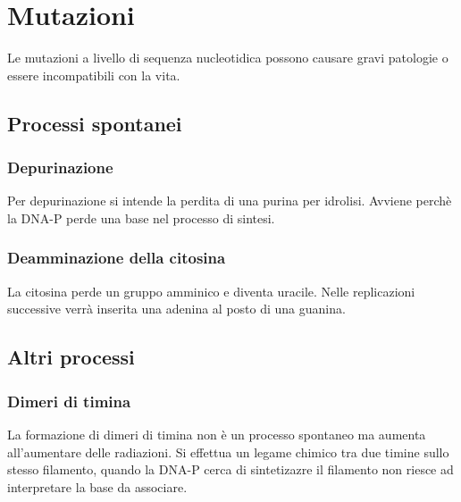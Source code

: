\section{Mutazioni}
    Le mutazioni a livello di sequenza nucleotidica possono causare gravi patologie o essere incompatibili con la vita.
    \subsection{Processi spontanei}
        \subsubsection{Depurinazione}
            Per depurinazione si intende la perdita di una purina per idrolisi. Avviene perchè la DNA-P perde una base nel processo di sintesi.
        \subsubsection{Deamminazione della citosina}
            La citosina perde un gruppo amminico e diventa uracile. Nelle replicazioni successive verrà inserita una adenina al posto di una guanina.
    
    \subsection{Altri processi}
        \subsubsection{Dimeri di timina}
            La formazione di dimeri di timina non è un processo spontaneo ma aumenta all'aumentare delle radiazioni. Si effettua un legame chimico tra due timine sullo stesso filamento, quando la DNA-P cerca di sintetizazre il filamento non riesce ad interpretare la base da associare.
